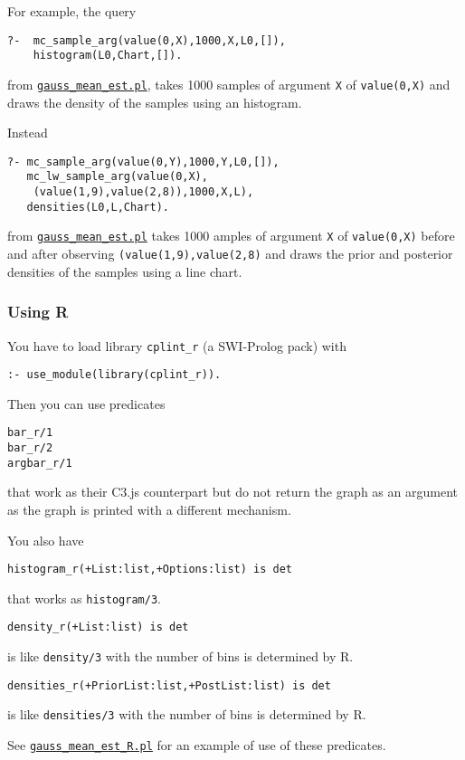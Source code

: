 For example, the query
\begin{verbatim}
?-  mc_sample_arg(value(0,X),1000,X,L0,[]),
    histogram(L0,Chart,[]).
\end{verbatim}
from \href{http://cplint.eu/example/inference/gauss_mean_est.pl}{\texttt{gauss\_mean\_est.pl}},
takes 1000 samples of argument \verb|X| of \verb|value(0,X)| and draws the density of the samples using an histogram.

Instead
\begin{verbatim}
?- mc_sample_arg(value(0,Y),1000,Y,L0,[]),
   mc_lw_sample_arg(value(0,X),
    (value(1,9),value(2,8)),1000,X,L),
   densities(L0,L,Chart).
\end{verbatim}
from \href{http://cplint.eu/example/inference/gauss_mean_est.pl}{\texttt{gauss\_mean\_est.pl}}
takes 1000 amples of argument \verb|X| of \verb|value(0,X)| before and after observing
\verb|(value(1,9),value(2,8)| and draws the prior and posterior densities of the samples using a line chart.

\subsubsection{Using R}
You have to load library \texttt{cplint\_r}  (a SWI-Prolog pack) with
\begin{verbatim}
:- use_module(library(cplint_r)).
\end{verbatim}
Then you can use predicates
\begin{verbatim}
bar_r/1
bar_r/2
argbar_r/1
\end{verbatim}
that work as their C3.js counterpart but do not return the graph as an argument as the graph is
printed with a different mechanism.

You also have
\begin{verbatim}
histogram_r(+List:list,+Options:list) is det
\end{verbatim}
that works as \texttt{histogram/3}.
\begin{verbatim}
density_r(+List:list) is det
\end{verbatim}
is like \texttt{density/3} with the number of bins  is determined
by R.
\begin{verbatim}
densities_r(+PriorList:list,+PostList:list) is det
\end{verbatim}
is like \texttt{densities/3} with the number of bins  is determined
by R.

See \href{http://cplint.eu/example/inference/gauss_mean_est_R.pl}{\texttt{gauss\_mean\_est\_R.pl}} for an example of use of these predicates.


